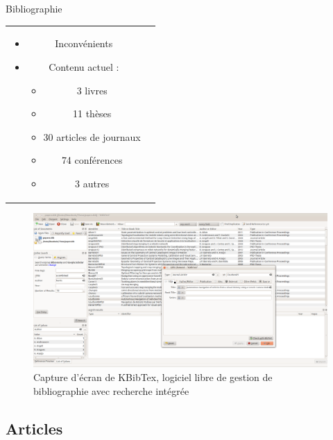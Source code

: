 \documentclass{beamer}
\begin{document}
\begin{frame}{Bibliographie}
\begin{tabular}{c c}
\begin{minipage}{0.6\linewidth}
\begin{itemize}
      \item Inconvénients
        \vspace{5mm}
      \item Contenu actuel : %
        \begin{itemize}
        \item 3 livres
        \item 11 thèses
        \item 30 articles de journaux
        \item 74 conférences
        \item 3 autres
        \end{itemize}
      \end{itemize}
    \end{minipage}
  \end{tabular}
\end{frame}

\begin{frame}
  \begin{figure}
    \includegraphics[width=1.0\linewidth]{images/KBibTex.png}
    \caption{Capture d'écran de KBibTex, logiciel libre de gestion de bibliographie avec recherche intégrée}
  \end{figure}
\end{frame}

\subsection*{Articles}
\end{document}

